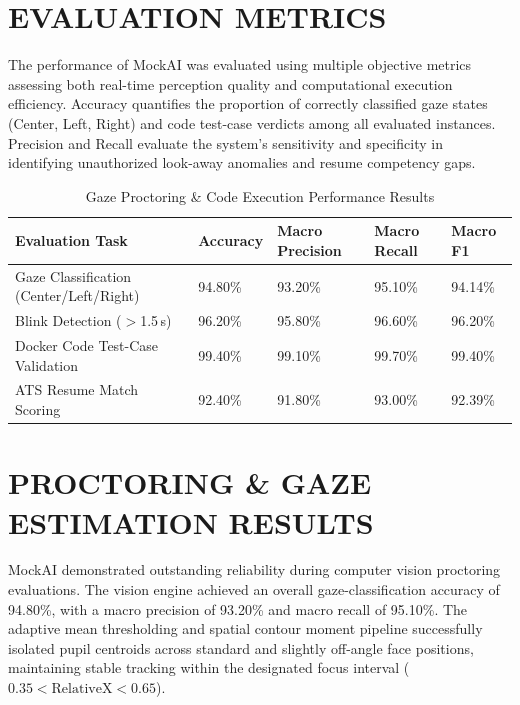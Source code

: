 \documentclass[12pt,a4paper]{report}
\begin{document}
\section{EVALUATION METRICS}

The performance of MockAI was evaluated using multiple objective metrics assessing both
real-time perception quality and computational execution efficiency. Accuracy quantifies
the proportion of correctly classified gaze states (Center, Left, Right) and code test-case
verdicts among all evaluated instances. Precision and Recall evaluate the system's
sensitivity and specificity in identifying unauthorized look-away anomalies and resume
competency gaps.

\begin{table}[htbp]
  \centering
  \caption{Gaze Proctoring \& Code Execution Performance Results}
  \label{tab:results}
  \renewcommand{\arraystretch}{1.3}
  \begin{tabular}{p{4cm} p{2.2cm} p{2.5cm} p{2.2cm} p{2.2cm}}
    \toprule
    \textbf{Evaluation Task} &
    \textbf{Accuracy} &
    \textbf{Macro Precision} &
    \textbf{Macro Recall} &
    \textbf{Macro F1} \\
    \midrule
    Gaze Classification (Center/Left/Right) &
    94.80\% & 93.20\% & 95.10\% & 94.14\% \\
    \addlinespace
    Blink Detection ($>$1.5\,s) &
    96.20\% & 95.80\% & 96.60\% & 96.20\% \\
    \addlinespace
    Docker Code Test-Case Validation &
    99.40\% & 99.10\% & 99.70\% & 99.40\% \\
    \addlinespace
    ATS Resume Match Scoring &
    92.40\% & 91.80\% & 93.00\% & 92.39\% \\
    \bottomrule
  \end{tabular}
\end{table}

\section{PROCTORING \& GAZE ESTIMATION RESULTS}

MockAI demonstrated outstanding reliability during computer vision proctoring evaluations.
The vision engine achieved an overall gaze-classification accuracy of 94.80\%, with a
macro precision of 93.20\% and macro recall of 95.10\%. The adaptive mean thresholding
and spatial contour moment pipeline successfully isolated pupil centroids across standard
and slightly off-angle face positions, maintaining stable tracking within the designated
focus interval ($0.35 < \text{RelativeX} < 0.65$).
\end{document}
